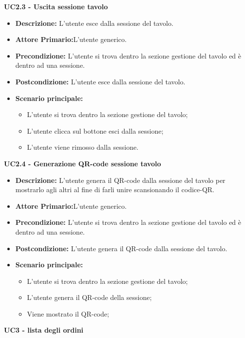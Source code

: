 \textbf{UC2.3 - Uscita sessione tavolo}
\begin{itemize}
    \item \textbf{Descrizione:} L'utente esce dalla sessione del tavolo.
    \item \textbf{Attore Primario:}L'utente generico.
    \item \textbf{Precondizione:} L'utente si trova dentro la sezione gestione del tavolo ed è dentro ad una sessione.
    \item \textbf{Postcondizione:} L'utente esce dalla sessione del tavolo.
    \item \textbf{Scenario principale:}
    \begin{itemize}
        \item L'utente si trova dentro la sezione gestione del tavolo;
        \item L'utente clicca sul bottone esci dalla sessione;
        \item L'utente viene rimosso dalla sessione.
    \end{itemize}
\end{itemize}
\textbf{UC2.4 - Generazione QR-code sessione tavolo}
\begin{itemize}
    \item \textbf{Descrizione:} L'utente genera il QR-code dalla sessione del tavolo per mostrarlo agli altri al fine di farli unire scansionando il codice-QR.
    \item \textbf{Attore Primario:}L'utente generico.
    \item \textbf{Precondizione:} L'utente si trova dentro la sezione gestione del tavolo ed è dentro ad una sessione.
    \item \textbf{Postcondizione:} L'utente genera il QR-code dalla sessione del tavolo.
    \item \textbf{Scenario principale:}
    \begin{itemize}
        \item L'utente si trova dentro la sezione gestione del tavolo;
        \item L'utente genera il QR-code della sessione;
        \item Viene mostrato il QR-code;
    \end{itemize}
\end{itemize}
\textbf{UC3 - lista degli ordini}
